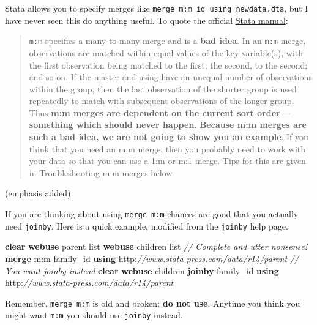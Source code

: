 \documentclass[
]{book}
\newenvironment{Shaded}{\begin{snugshade}}{\end{snugshade}}
\newcommand{\CommentTok}[1]{\textcolor[rgb]{0.56,0.35,0.01}{\textit{#1}}}
\newcommand{\FunctionTok}[1]{\textcolor[rgb]{0.00,0.00,0.00}{#1}}
\newcommand{\KeywordTok}[1]{\textcolor[rgb]{0.13,0.29,0.53}{\textbf{#1}}}
\newcommand{\NormalTok}[1]{#1}
\newcommand{\OtherTok}[1]{\textcolor[rgb]{0.56,0.35,0.01}{#1}}
\begin{document}
Stata allows you to specify merges like \texttt{merge\ m:m\ id\ using\ newdata.dta}, but I have never seen this do anything useful. To quote the official \href{https://www.stata.com/manuals13/dmerge.pdf}{Stata manual}:

\begin{quote}
\texttt{m:m} specifies a many-to-many merge and is a \textbf{bad idea}. In an \texttt{m:m} merge, observations are matched within equal values of the key variable(s), with the first observation being matched to the first; the second, to the second; and so on. If the master and using have an unequal number of observations within the group, then the last observation of the shorter group is used repeatedly to match with subsequent observations of the longer group. Thus \textbf{m:m merges are dependent on the current sort order---something which should never happen}. \textbf{Because m:m merges are such a bad idea, we are not going to show you an example}. If you think that you need an m:m merge, then you probably need to work with your data so that you can use a 1:m or m:1 merge. Tips for this are given in Troubleshooting m:m merges below
\end{quote}

(emphasis added).

If you are thinking about using \texttt{merge\ m:m} chances are good that you actually need \texttt{joinby}. Here is a quick example, modified from the \texttt{joinby} help page.

\begin{Shaded}
\begin{Highlighting}[]
  \KeywordTok{clear}
  \KeywordTok{webuse}\NormalTok{ parent}
  \OtherTok{list}
  \KeywordTok{webuse}\NormalTok{ children}
  \OtherTok{list}
  \CommentTok{// Complete and utter nonsense!}
  \KeywordTok{merge} \FunctionTok{m}\NormalTok{:}\FunctionTok{m}\NormalTok{ family_id }\KeywordTok{using}\NormalTok{ http:}\CommentTok{//www.stata-press.com/data/r14/parent }
  \CommentTok{// You want joinby instead}
  \KeywordTok{clear}
  \KeywordTok{webuse}\NormalTok{ children}
  \KeywordTok{joinby}\NormalTok{ family_id }\KeywordTok{using}\NormalTok{ http:}\CommentTok{//www.stata-press.com/data/r14/parent }
\end{Highlighting}
\end{Shaded}

Remember, \texttt{merge\ m:m} is old and broken; \textbf{do not use}. Anytime you think you might want \texttt{m:m} you should use \texttt{joinby} instead.
\end{document}
